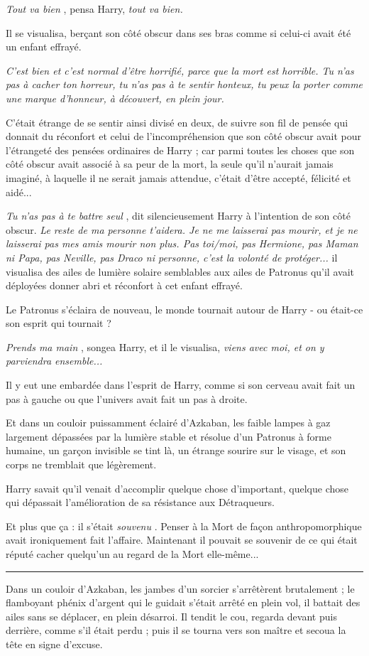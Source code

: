 \emph{Tout va bien} , pensa Harry, \emph{tout va bien.} 

Il se visualisa, berçant son côté obscur dans ses bras comme si celui-ci avait été un enfant effrayé.

\emph{C'est bien et c'est normal d'être horrifié, parce que la mort est horrible. Tu n'as pas à cacher ton horreur, tu n'as pas à te sentir honteux, tu peux la porter comme une marque d'honneur, à découvert, en plein jour.} 

C'était étrange de se sentir ainsi divisé en deux, de suivre son fil de pensée qui donnait du réconfort et celui de l'incompréhension que son côté obscur avait pour l'étrangeté des pensées ordinaires de Harry ; car parmi toutes les choses que son côté obscur avait associé à sa peur de la mort, la seule qu'il n'aurait jamais imaginé, à laquelle il ne serait jamais attendue, c'était d'être accepté, félicité et aidé...

\emph{Tu n'as pas à te battre seul} , dit silencieusement Harry à l'intention de son côté obscur. \emph{Le reste de ma personne t'aidera. Je ne me laisserai pas mourir, et je ne laisserai pas mes amis mourir non plus. Pas toi/moi, pas Hermione, pas Maman ni Papa, pas Neville, pas Draco ni personne, c'est la volonté de protéger...}  il visualisa des ailes de lumière solaire semblables aux ailes de Patronus qu'il avait déployées donner abri et réconfort à cet enfant effrayé.

Le Patronus s'éclaira de nouveau, le monde tournait autour de Harry - ou était-ce son esprit qui tournait ?

\emph{Prends ma main} , songea Harry, et il le visualisa, \emph{viens avec moi, et on y parviendra ensemble...} 

Il y eut une embardée dans l'esprit de Harry, comme si son cerveau avait fait un pas à gauche ou que l'univers avait fait un pas à droite.

Et dans un couloir puissamment éclairé d'Azkaban, les faible lampes à gaz largement dépassées par la lumière stable et résolue d'un Patronus à forme humaine, un garçon invisible se tint là, un étrange sourire sur le visage, et son corps ne tremblait que légèrement.

Harry savait qu'il venait d'accomplir quelque chose d'important, quelque chose qui dépassait l'amélioration de sa résistance aux Détraqueurs.

Et plus que ça : il s'était \emph{souvenu} . Penser à la Mort de façon anthropomorphique avait ironiquement fait l'affaire. Maintenant il pouvait se souvenir de ce qui était réputé cacher quelqu'un au regard de la Mort elle-même...
\par\noindent\rule{\textwidth}{0.4pt}
Dans un couloir d'Azkaban, les jambes d'un sorcier s'arrêtèrent brutalement ; le flamboyant phénix d'argent qui le guidait s'était arrêté en plein vol, il battait des ailes sans se déplacer, en plein désarroi. Il tendit le cou, regarda devant puis derrière, comme s'il était perdu ; puis il se tourna vers son maître et secoua la tête en signe d'excuse.

